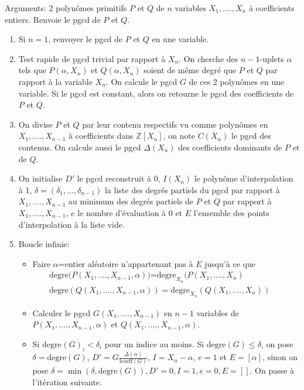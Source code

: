 \documentclass[a4paper,11pt]{article}
\begin{document}
Arguments: 2 polynômes primitifs $P$ et $Q$ de $n$ variables $X_1, \ldots .,
X_n$ à coefficients entiers. Renvoie le pgcd de $P$ et $Q$.
\begin{enumerate}
  \item Si $n = 1$, renvoyer le pgcd de $P$ et $Q$ en une variable.
  
  \item Test rapide de pgcd trivial par rapport à $X_n$. On cherche des $n -
  1$-uplets $\alpha$ tels que $P ( \alpha, X_n )$ et $Q ( \alpha, X_n )$
  soient de même degré que $P$ et $Q$ par rapport à la variable $X_n$. On
  calcule le pgcd $G$ de ces 2 polynômes en une variable. Si le pgcd est
  constant, alors on retourne le pgcd des coefficients de $P$ et $Q$.
  
  \item On divise $P$ et $Q$ par leur contenu respectifs vu comme polynômes en
  $X_1, \ldots ., X_{n - 1}$ à coefficients dans $\mathbb{Z} [ X_n ]$, on note
  $C ( X_n )$ le pgcd des contenus. On calcule aussi le pgcd $\Delta ( X_n )$
  des coefficients dominants de $P$ et de $Q$.
  
  \item On initialise $D'$ le pgcd reconstruit à 0, $I ( X_n )$ le polynôme
  d'interpolation à 1, $\delta=(\delta_1,...,\delta_{n-1})$ 
  la liste des degrés partiels du pgcd par
  rapport à $X_1, \ldots ., X_{n - 1}$ au minimum des degrés partiels de $P$
  et $Q$ par rapport à $X_1, \ldots ., X_{n - 1}$, $e$ le nombre d'évaluation
  à 0 et $E$ l'ensemble des points d'interpolation à la liste vide.
  
  \item Boucle infinie:
  \begin{itemize}
    \item Faire $\alpha$=entier aléatoire n'appartenant pas à $E$ jusqu'à ce
    que
    \begin{eqnarray*}
      \text{degre($P ( X_1, \ldots ., X_{n - 1}, \alpha
      ))$=$\mbox{degre}_{X_n} ( P ( X_1, \ldots ., X_n )$} &  & \\
      \mbox{degre} ( Q ( X_1, \ldots ., X_{n - 1}, \alpha )) =
      \mbox{degre}_{X_n} ( Q ( X_1, \ldots ., X_n )) &  & 
    \end{eqnarray*}
    \item Calculer le pgcd $G ( X_1, \ldots ., X_{n - 1} )$ en $n - 1$
    variables de $P ( X_1, \ldots ., X_{n - 1}, \alpha )$ et $Q ( X_1, \ldots
    ., X_{n - 1}, \alpha )$.
    
    \item Si $\mbox{degre}_{} ( G )_i < \delta_i$ pour un indice au moins.
    Si $\mbox{degre} ( G ) \leqslant \delta$, on pose $\delta =
    \mbox{degre} ( G )$, $D' = G \frac{\Delta ( \alpha )}{\mbox{lcoeff} ( G
    )}$, $I = X_n - \alpha$, $e = 1$ et $E = [ \alpha ]$, sinon on pose $\delta
    = \min ( \delta, \mbox{degre} ( G )), D' = 0, I = 1, e = 0, E = [ ]$.
    On passe à l'itération suivante.


\end{itemize}
\end{enumerate}
\end{document}

